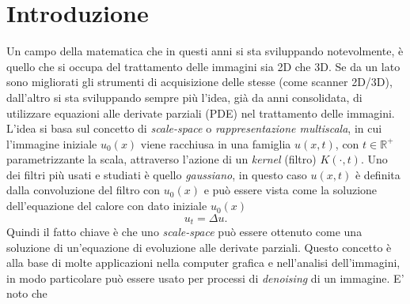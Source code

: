 \chapter*{Introduzione}
{}

Un campo della matematica che in questi anni si sta sviluppando
notevolmente, è quello che si occupa del trattamento delle immagini
sia 2D che 3D. Se da un lato sono migliorati gli strumenti di
acquisizione delle stesse (come  scanner 2D/3D), dall'altro si sta
sviluppando sempre più l'idea, già da anni consolidata, di utilizzare
equazioni alle derivate parziali (PDE) nel trattamento delle
immagini. L'idea si basa sul concetto di \emph{scale-space} o
\emph{rappresentazione multiscala}, in cui l'immagine
iniziale $u_0(x)$ viene racchiusa in una famiglia $u(x,t)$, con
$t\in\mathbb{R}^+$ parametrizzante la scala, attraverso l'azione di un
\emph{kernel} (filtro) $K(\cdot,t)$. Uno dei filtri più
usati  e studiati è quello \emph{gaussiano}, in questo caso  $u(x,t)$
è definita dalla convoluzione del filtro con $u_0(x)$ e può essere
vista come la soluzione dell'equazione del calore con dato iniziale $u_0(x)$
\[
u_t=\Delta u.
\]
Quindi il fatto chiave è che uno \emph{scale-space} può essere
ottenuto come una soluzione di un'equazione di evoluzione alle
derivate parziali. 
Questo concetto è alla base di molte applicazioni nella computer
grafica e nell'analisi dell'immagini, in modo particolare può essere
usato per processi di \emph{denoising} di un immagine. E' noto che
